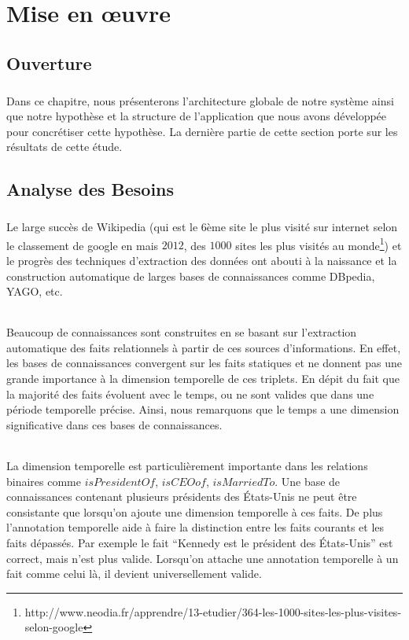 \chapter{Mise en \oe{}uvre}
\section{Ouverture}
\paragraph{}
Dans ce chapitre, nous présenterons l'architecture globale de notre système ainsi que notre hypothèse et la structure de l'application que nous avons développée pour concrétiser cette hypothèse. La dernière partie de cette section porte sur les résultats de cette étude.
\section{Analyse des Besoins}
\paragraph{}
Le large succès de Wikipedia (qui est le 6ème site le plus visité sur internet selon le classement de google en mais $2012$, des $1000$ sites les plus visités au monde\footnote{http://www.neodia.fr/apprendre/13-etudier/364-les-1000-sites-les-plus-visites-selon-google}) et le progrès des techniques d’extraction des données ont abouti à la naissance et la construction automatique  de larges bases de connaissances comme DBpedia, YAGO, etc.
\subparagraph{}
Beaucoup de connaissances sont construites en se basant sur l’extraction automatique des faits relationnels à partir de ces sources d'informations.
En effet, les bases de connaissances convergent sur les faits statiques et ne donnent pas une grande importance à la dimension temporelle de ces triplets.
En dépit du fait que la majorité des faits évoluent avec le temps, ou ne sont valides que dans une période temporelle précise. Ainsi, nous remarquons que le temps a une dimension significative dans ces bases de connaissances.
\subparagraph{}
La dimension temporelle est particulièrement importante dans les relations binaires comme $isPresidentOf$, $isCEOof$, $isMarriedTo$. Une base de connaissances contenant plusieurs présidents des États-Unis ne peut être consistante que lorsqu’on ajoute une dimension temporelle à ces faits. De plus l’annotation temporelle aide à faire la distinction entre les faits courants et les faits dépassés.
Par exemple le fait ``Kennedy est le président des États-Unis'' est correct, mais n'est plus valide.
Lorsqu’on attache une annotation temporelle à un fait comme celui là, il devient universellement valide.

